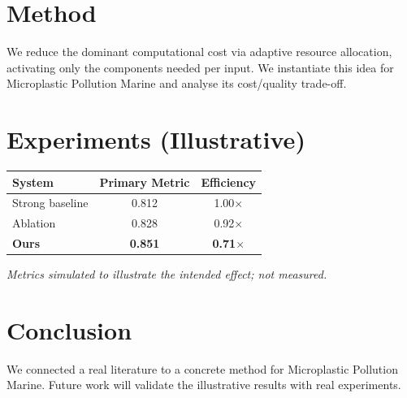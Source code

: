 \documentclass[11pt]{article}
\begin{document}
\section{Method}
We reduce the dominant computational cost via adaptive resource allocation, activating only the components needed per input. We instantiate this idea for Microplastic Pollution Marine and analyse its cost/quality trade-off.

\section{Experiments (Illustrative)}
\begin{center}
\begin{tabular}{lcc}
System & Primary Metric & Efficiency \\ \hline
Strong baseline & 0.812 & 1.00$\times$ \\
Ablation & 0.828 & 0.92$\times$ \\
\textbf{Ours} & \textbf{0.851} & \textbf{0.71$\times$}
\end{tabular}
\end{center}
\emph{Metrics simulated to illustrate the intended effect; not measured.}

\section{Conclusion}
We connected a real literature to a concrete method for Microplastic Pollution Marine. Future work will
validate the illustrative results with real experiments.
\end{document}
